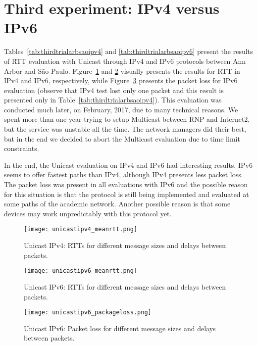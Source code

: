 \section{Third experiment: IPv4 versus IPv6}
\label{sec:thirdtrial}

Tables~\ref{tab:thirdtrialarbsaoipv4} and \ref{tab:thirdtrialarbsaoipv6} present the results of RTT evaluation with Unicast through IPv4 and IPv6 protocols between Ann Arbor and São Paulo.
Figure~\ref{fig:third-ipv4-rtt} and \ref{fig:third-ipv6-rtt} visually presents the results for RTT in IPv4 and IPv6, respectively, while Figure~\ref{fig:third-ipv6-packetloss} presents the packet loss for IPv6 evaluation (observe that IPv4 test lost only one packet and this result is presented only in Table~\ref{tab:thirdtrialarbsaoipv4}).
This evaluation was conducted much later, on February, 2017, due to many technical reasons.
We spent more than one year trying to setup Multicast between RNP and Internet2, but the service was unstable all the time.
The network managers did their best, but in the end we decided to abort the Multicast evaluation due to time limit constraints.

In the end, the Unicast evaluation on IPv4 and IPv6 had interesting results.
IPv6 seems to offer fastest paths than IPv4, although IPv4 presents less packet loss.
The packet loss was present in all evaluations with IPv6 and the possible reason for this situation is that the protocol is still being implemented and evaluated at some paths of the academic network.
Another possible reason is that some devices may work unpredictably with this protocol yet.

\begin{figure}[!ht]
	\centering
	\texttt{[image: unicastipv4\_meanrtt.png]}
	\caption{Unicast IPv4: RTTs for different message sizes and delays between packets.}
	\label{fig:third-ipv4-rtt}
\end{figure}

\begin{figure}[!ht]
	\centering
	\texttt{[image: unicastipv6\_meanrtt.png]}
	\caption{Unicast IPv6: RTTs for different message sizes and delays between packets.}
	\label{fig:third-ipv6-rtt}
\end{figure}

\begin{figure}[!ht]
	\centering
	\texttt{[image: unicastipv6\_packageloss.png]}
	\caption{Unicast IPv6: Packet loss for different message sizes and delays between packets.}
	\label{fig:third-ipv6-packetloss}
\end{figure}

